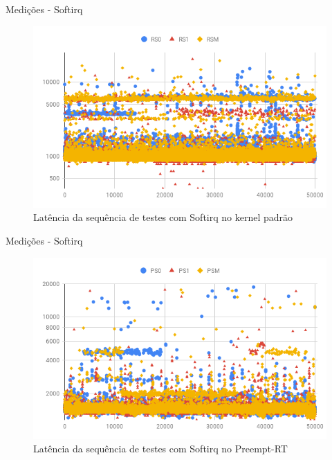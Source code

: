 \documentclass[12pt,brazil]{beamer}
\begin{document}
\begin{frame}{Medições - Softirq}
    
    \begin{figure}[!htb]
        \centering
        \includegraphics[width=\textwidth]{figures/rs-scatter.png}
        \caption*{Latência da sequência de testes com Softirq no kernel padrão}
        \label{grafico:r-softirq}
    \end{figure}

\end{frame}

\begin{frame}{Medições - Softirq}
    
    \begin{figure}[!htb]
        \centering
        \includegraphics[width=\textwidth]{figures/ps-scatter.png}
        \caption*{Latência da sequência de testes com Softirq no Preempt-RT}
        \label{grafico:r-softirq}
    \end{figure}

\end{frame}
\end{document}
